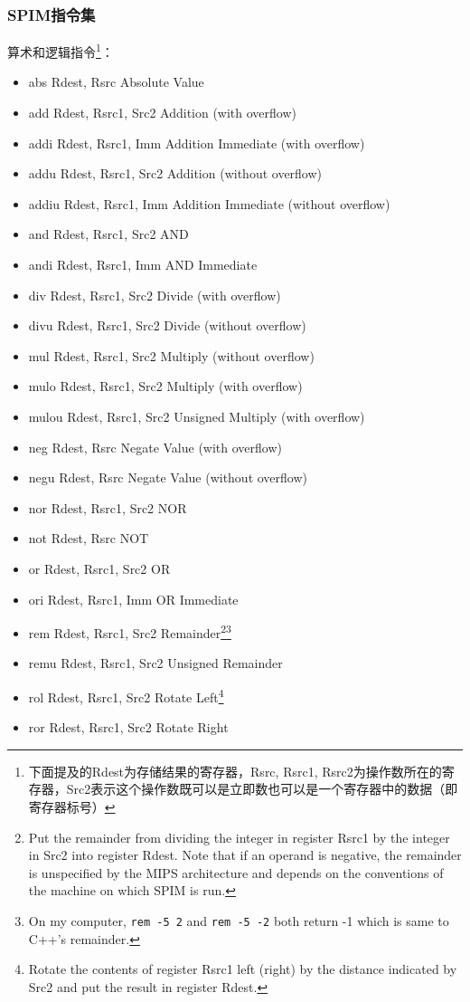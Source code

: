 \documentclass[a4paper, 11pt]{article}
\begin{document}
\subsubsection{SPIM指令集}
	算术和逻辑指令\footnote{下面提及的Rdest为存储结果的寄存器，Rsrc, Rsrc1, Rsrc2为操作数所在的寄存器，Src2表示这个操作数既可以是立即数也可以是一个寄存器中的数据（即寄存器标号）}：
	\begin{itemize}
		\item abs Rdest, Rsrc	\hfill Absolute Value
		\item add Rdest, Rsrc1, Src2	\hfill Addition (with overflow)
		\item addi Rdest, Rsrc1, Imm	\hfill Addition Immediate (with overflow)
		\item addu Rdest, Rsrc1, Src2	\hfill Addition (without overflow)
		\item addiu Rdest, Rsrc1, Imm	\hfill Addition Immediate (without overflow)
		\item and Rdest, Rsrc1, Src2	\hfill AND
		\item andi Rdest, Rsrc1, Imm	\hfill AND Immediate
		\item div Rdest, Rsrc1, Src2	\hfill Divide (with overflow)
		\item divu Rdest, Rsrc1, Src2	\hfill Divide (without overflow)
		\item mul Rdest, Rsrc1, Src2	\hfill Multiply (without overflow)
		\item mulo Rdest, Rsrc1, Src2	\hfill Multiply (with overflow)
		\item mulou Rdest, Rsrc1, Src2	\hfill Unsigned Multiply (with overflow)
		\item neg Rdest, Rsrc	\hfill Negate Value (with overflow)
		\item negu Rdest, Rsrc	\hfill Negate Value (without overflow)
		\item nor Rdest, Rsrc1, Src2	\hfill NOR
		\item not Rdest, Rsrc	\hfill NOT
		\item or Rdest, Rsrc1, Src2	\hfill OR
		\item ori Rdest, Rsrc1, Imm	OR \hfill Immediate
		\item rem Rdest, Rsrc1, Src2	\hfill Remainder\footnote{Put the remainder from dividing the integer in register Rsrc1 by the integer in Src2 into register Rdest. Note that if an operand is negative, the remainder is unspecified by the MIPS architecture and depends on the conventions of the machine on which SPIM is run.}\footnote{On my computer, \texttt{rem -5 2} and \texttt{rem -5 -2}  both return -1 which is same to C++'s remainder.}
		\item remu Rdest, Rsrc1, Src2	\hfill Unsigned Remainder
		\item rol Rdest, Rsrc1, Src2	\hfill Rotate Left\footnote{Rotate the contents of register Rsrc1 left (right) by the distance indicated by Src2 and put the result in register Rdest.}
		\item ror Rdest, Rsrc1, Src2	\hfill Rotate Right


\end{itemize}
\end{document}
